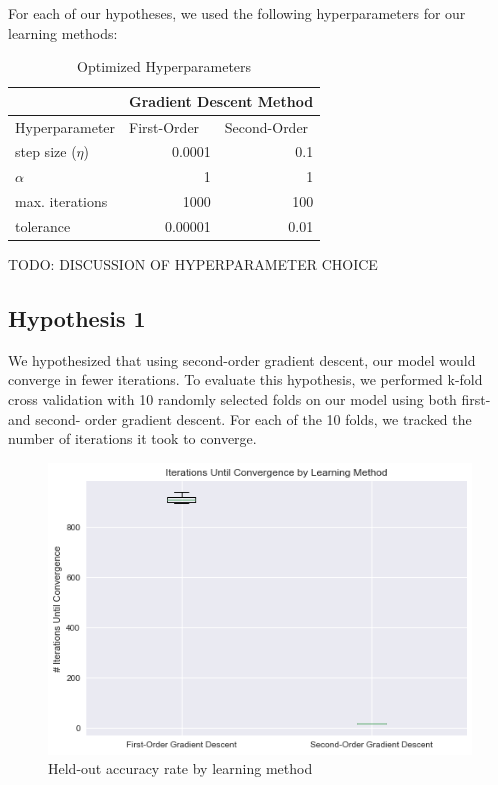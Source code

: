\documentclass[11pt]{extarticle}
\begin{document}
For each of our hypotheses, we used the following hyperparameters for our learning methods:

\begin{center}
\begin{table}[h]
\centering
\caption{Optimized Hyperparameters}
\begin{tabular}{lrr}
\hline
                & \multicolumn{2}{l}{Gradient Descent Method}                          \\ 
\hline
\hline
Hyperparameter  & \multicolumn{1}{l}{First-Order~} & \multicolumn{1}{l}{Second-Order}  \\ 
\hline
step size ($\eta$) & 0.0001                           & 0.1                               \\
$\alpha$           & 1                                & 1                                 \\
max. iterations    & 1000                             & 100                              \\
tolerance          & 0.00001                          & 0.01                              \\
\hline
\end{tabular}
\end{table}
\end{center}

TODO: DISCUSSION OF HYPERPARAMETER CHOICE

\newpage

\subsection{Hypothesis 1}

We hypothesized that using second-order gradient descent, our model would converge in fewer iterations. To evaluate this hypothesis, we performed k-fold cross validation with 10 randomly selected folds on our model using both first- and second- order gradient descent. For each of the 10 folds, we tracked the number of iterations it took to converge.

\begin{figure}[h!]
\begin{center}
    \includegraphics[scale=.7]{iterations.png}
    \caption{Held-out accuracy rate by learning method}
     \label{fig:x}
\end{center}
\end{figure}
\end{document}
